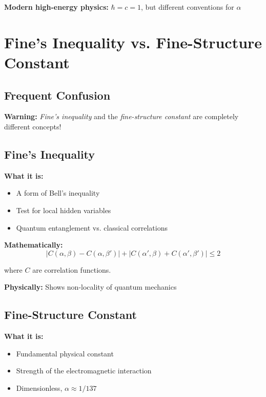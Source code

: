 	\textbf{Modern high-energy physics:} $\hbar = c = 1$, but different conventions for $\alpha$
	
	\section{Fine's Inequality vs. Fine-Structure Constant}
	
	\subsection{Frequent Confusion}
	
	\textbf{Warning:} \textit{Fine's inequality} and the \textit{fine-structure constant} are completely different concepts!
	
	\subsection{Fine's Inequality}
	
	\textbf{What it is:}
	\begin{itemize}
		\item A form of Bell's inequality
		\item Test for local hidden variables
		\item Quantum entanglement vs. classical correlations
	\end{itemize}
	
	\textbf{Mathematically:}
	\begin{equation}
		|C(\alpha, \beta) - C(\alpha, \beta')| + |C(\alpha', \beta) + C(\alpha', \beta')| \leq 2
	\end{equation}
	
	where $C$ are correlation functions.
	
	\textbf{Physically:} Shows non-locality of quantum mechanics
	
	\subsection{Fine-Structure Constant}
	
	\textbf{What it is:}
	\begin{itemize}
		\item Fundamental physical constant
		\item Strength of the electromagnetic interaction
		\item Dimensionless, $\alpha \approx 1/137$
	\end{itemize}
	

